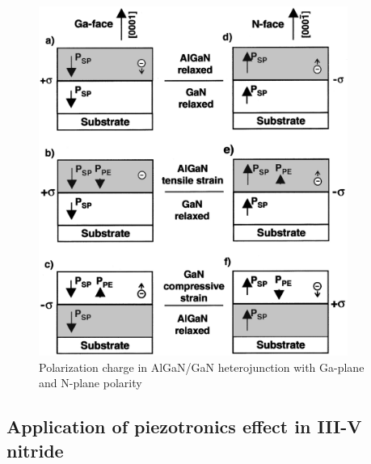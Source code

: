 \begin{figure}[H] 
\centering    
\includegraphics[width=0.9\textwidth]{ch1_8}
\caption[Polarization charge in AlGaN/GaN heterojunction with Ga-plane and N-plane polarity]{Polarization charge in AlGaN/GaN heterojunction with Ga-plane and N-plane polarity \protect\cite{ambacher1999two}}
\label{fig:1.8}
\end{figure}

\subsection{Application of piezotronics effect in III-V nitride}

